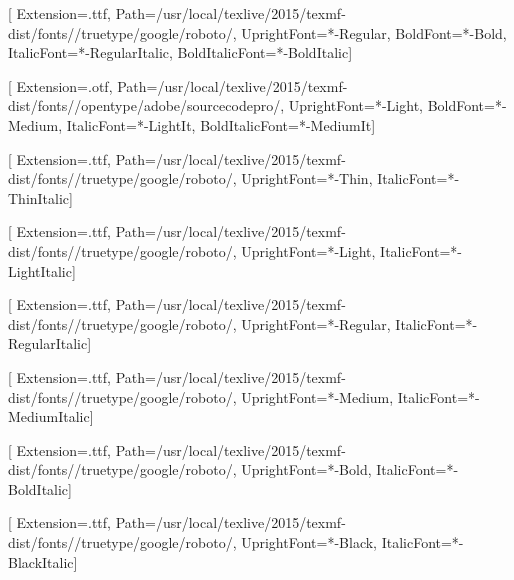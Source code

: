 
\newcommand{\fontdir}[0]{/usr/local/texlive/2015/texmf-dist/fonts/}
\newcommand{\robotodir}[0]{\fontdir/truetype/google/roboto/}
\newcommand{\sourcecodeprodir}[0]{\fontdir/opentype/adobe/sourcecodepro/}

\newcommand{\robotomd}[0]{Light}
\newcommand{\robotobf}[0]{Medium}
\newcommand{\robotoit}[0]{LightItalic}
\newcommand{\robotobi}[0]{MediumItalic}
\newcommand{\codepromd}[0]{Light}
\newcommand{\codeprobf}[0]{Medium}
\newcommand{\codeproit}[0]{LightIt}
\newcommand{\codeprobi}[0]{MediumIt}

\newfontfamily{}[
  Extension=.ttf,
  Path=\robotodir,
  UprightFont=*-Regular,
  BoldFont=*-Bold,
  ItalicFont=*-RegularItalic,
  BoldItalicFont=*-BoldItalic]

\newfontfamily{}[
  Extension=.otf,
  Path=\sourcecodeprodir,
  UprightFont=*-\codepromd,
  BoldFont=*-\codeprobf,
  ItalicFont=*-\codeproit,
  BoldItalicFont=*-\codeprobi]

\newfontfamily{}[
  Extension=.ttf,
  Path=\robotodir,
  UprightFont=*-Thin,
  ItalicFont=*-ThinItalic]

\newfontfamily{}[
  Extension=.ttf,
  Path=\robotodir,
  UprightFont=*-Light,
  ItalicFont=*-LightItalic]

\newfontfamily{}[
  Extension=.ttf,
  Path=\robotodir,
  UprightFont=*-Regular,
  ItalicFont=*-RegularItalic]

\newfontfamily{}[
  Extension=.ttf,
  Path=\robotodir,
  UprightFont=*-Medium,
  ItalicFont=*-MediumItalic]

\newfontfamily{}[
  Extension=.ttf,
  Path=\robotodir,
  UprightFont=*-Bold,
  ItalicFont=*-BoldItalic]

\newfontfamily{}[
  Extension=.ttf,
  Path=\robotodir,
  UprightFont=*-Black,
  ItalicFont=*-BlackItalic]

\newcommand{\setdefaultwesternfonts}[0]{
  
  \setmainfont{Roboto}[
    Extension=.ttf,
    Path=\robotodir,
    UprightFont=*-\robotomd,
    BoldFont=*-\robotobf,
    ItalicFont=*-\robotoit,
    BoldItalicFont=*-\robotobi]

  \setsansfont{Roboto}[
    Extension=.ttf,
    Path=\robotodir,
    UprightFont=*-\robotomd,
    BoldFont=*-\robotobf,
    ItalicFont=*-\robotoit,
    BoldItalicFont=*-\robotobi]

  \setmonofont{SourceCodePro}[
    Extension=.otf,
    Path=\sourcecodeprodir,
    UprightFont=*-\codepromd,
    BoldFont=*-\codeprobf,
    ItalicFont=*-\codeproit,
    BoldItalicFont=*-\codeprobi]

}

